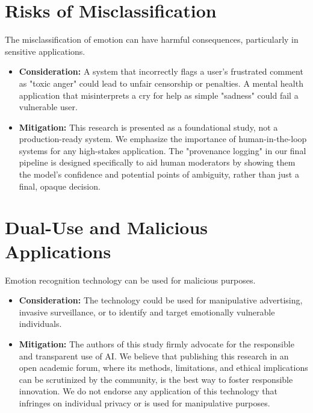 \section{Risks of Misclassification}

The misclassification of emotion can have harmful consequences, particularly in sensitive applications.
\begin{itemize}
    \item \textbf{Consideration:} A system that incorrectly flags a user's frustrated comment as "toxic anger" could lead to unfair censorship or penalties. A mental health application that misinterprets a cry for help as simple "sadness" could fail a vulnerable user.
    \item \textbf{Mitigation:} This research is presented as a foundational study, not a production-ready system. We emphasize the importance of human-in-the-loop systems for any high-stakes application. The "provenance logging" in our final pipeline is designed specifically to aid human moderators by showing them the model's confidence and potential points of ambiguity, rather than just a final, opaque decision.
\end{itemize}

\section{Dual-Use and Malicious Applications}

Emotion recognition technology can be used for malicious purposes.
\begin{itemize}
    \item \textbf{Consideration:} The technology could be used for manipulative advertising, invasive surveillance, or to identify and target emotionally vulnerable individuals.
    \item \textbf{Mitigation:} The authors of this study firmly advocate for the responsible and transparent use of AI. We believe that publishing this research in an open academic forum, where its methods, limitations, and ethical implications can be scrutinized by the community, is the best way to foster responsible innovation. We do not endorse any application of this technology that infringes on individual privacy or is used for manipulative purposes.
\end{itemize}